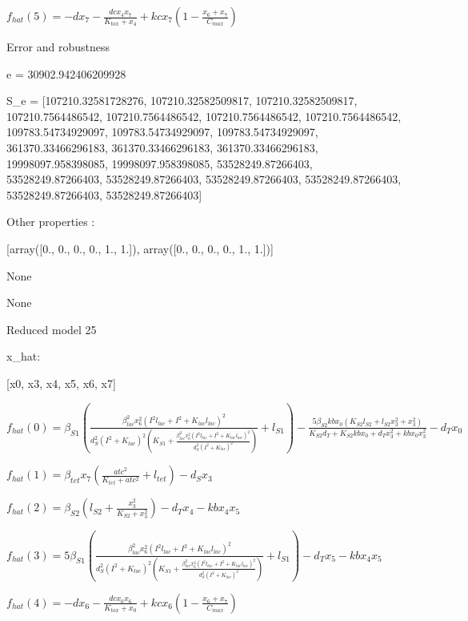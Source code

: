 $f_{hat}(5)=- d x_{7} - \frac{dc x_{4} x_{7}}{K_{tox} + x_{4}} + kc x_{7} \left(1 - \frac{x_{6} + x_{7}}{C_{max}}\right)$



Error and robustness 


e = 30902.942406209928

S_e = [107210.32581728276, 107210.32582509817, 107210.32582509817, 107210.7564486542, 107210.7564486542, 107210.7564486542, 107210.7564486542, 109783.54734929097, 109783.54734929097, 109783.54734929097, 361370.33466296183, 361370.33466296183, 361370.33466296183, 19998097.958398085, 19998097.958398085, 53528249.87266403, 53528249.87266403, 53528249.87266403, 53528249.87266403, 53528249.87266403, 53528249.87266403, 53528249.87266403]

Other properties :


[array([0., 0., 0., 0., 1., 1.]), array([0., 0., 0., 0., 1., 1.])]

None

None

Reduced model 25

x_{hat}: 

[x0, x3, x4, x5, x6, x7]


$f_{hat}(0)=\beta_{S1} \left(\frac{\beta_{lac}^{2} x_{6}^{2} \left(I^{2} l_{lac} + I^{2} + K_{lac} l_{lac}\right)^{2}}{d_{S}^{2} \left(I^{2} + K_{lac}\right)^{2} \left(K_{S1} + \frac{\beta_{lac}^{2} x_{6}^{2} \left(I^{2} l_{lac} + I^{2} + K_{lac} l_{lac}\right)^{2}}{d_{S}^{2} \left(I^{2} + K_{lac}\right)^{2}}\right)} + l_{S1}\right) - \frac{5 \beta_{S2} kb x_{0} \left(K_{S2} l_{S2} + l_{S2} x_{3}^{2} + x_{3}^{2}\right)}{K_{S2} d_{T} + K_{S2} kb x_{0} + d_{T} x_{3}^{2} + kb x_{0} x_{3}^{2}} - d_{T} x_{0}$


$f_{hat}(1)=\beta_{tet} x_{7} \left(\frac{atc^{2}}{K_{tet} + atc^{2}} + l_{tet}\right) - d_{S} x_{3}$


$f_{hat}(2)=\beta_{S2} \left(l_{S2} + \frac{x_{3}^{2}}{K_{S2} + x_{3}^{2}}\right) - d_{T} x_{4} - kb x_{4} x_{5}$


$f_{hat}(3)=5 \beta_{S1} \left(\frac{\beta_{lac}^{2} x_{6}^{2} \left(I^{2} l_{lac} + I^{2} + K_{lac} l_{lac}\right)^{2}}{d_{S}^{2} \left(I^{2} + K_{lac}\right)^{2} \left(K_{S1} + \frac{\beta_{lac}^{2} x_{6}^{2} \left(I^{2} l_{lac} + I^{2} + K_{lac} l_{lac}\right)^{2}}{d_{S}^{2} \left(I^{2} + K_{lac}\right)^{2}}\right)} + l_{S1}\right) - d_{T} x_{5} - kb x_{4} x_{5}$


$f_{hat}(4)=- d x_{6} - \frac{dc x_{0} x_{6}}{K_{tox} + x_{0}} + kc x_{6} \left(1 - \frac{x_{6} + x_{7}}{C_{max}}\right)$


